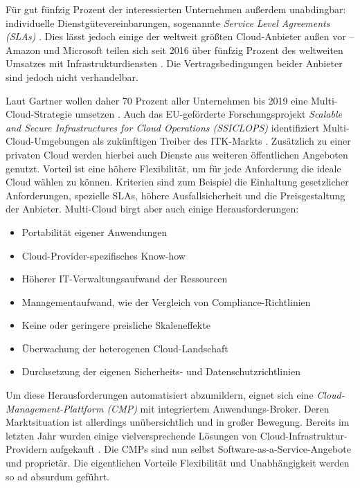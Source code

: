 Für gut fünfzig Prozent der interessierten Unternehmen außerdem unabdingbar: individuelle Dienstgütevereinbarungen, sogenannte \emph{Service Level Agreements (SLAs)} \cite{bitkom:2017:cloud-nutzung-unternehmen-auswahlkriterien}. Dies lässt jedoch einige der weltweit größten Cloud-Anbieter außen vor -- Amazon und Microsoft teilen sich seit 2016 über fünfzig Prozent des weltweiten Umsatzes mit Infrastrukturdiensten \cite{gartner:2017:cloud-market}. Die Vertragsbedingungen beider Anbieter sind jedoch nicht verhandelbar.

Laut Gartner wollen daher 70 Prozent aller Unternehmen bis 2019 eine Multi-Cloud-Strategie umsetzen \cite{gartner:2017:cloud-market-multicloud-trend}. Auch das EU-geförderte Forschungsprojekt \emph{Scalable and Secure Infrastructures for Cloud Operations (SSICLOPS)} identifiziert Multi-Cloud-Umgebungen als zukünftigen Treiber des ITK-Markts \cite{ssiclops:2015:d6.1-project-presentation}. Zusätzlich zu einer privaten Cloud werden hierbei auch Dienste aus weiteren öffentlichen Angeboten genutzt. Vorteil ist eine höhere Flexibilität, um für jede Anforderung die ideale Cloud wählen zu können. Kriterien sind zum Beispiel die Einhaltung gesetzlicher Anforderungen, spezielle SLAs, höhere Ausfallsicherheit und die Preisgestaltung der Anbieter. Multi-Cloud birgt aber auch einige Herausforderungen:

\begin{itemize}
	\item Portabilität eigener Anwendungen
	\item Cloud-Provider-spezifisches Know-how
	\item Höherer IT-Verwaltungsaufwand der Ressourcen
	\item Managementaufwand, wie der Vergleich von Compliance-Richtlinien
	\item Keine oder geringere preisliche Skaleneffekte
	\item Überwachung der heterogenen Cloud-Landschaft
	\item Durchsetzung der eigenen Sicherheits- und Datenschutzrichtlinien
\end{itemize}

Um diese Herausforderungen automatisiert abzumildern, eignet sich eine \emph{Cloud-Management-Plattform (CMP)} mit integriertem Anwendungs-Broker. Deren Marktsituation ist allerdings unübersichtlich und in großer Bewegung. Bereits im letzten Jahr wurden einige vielversprechende Lösungen von Cloud-Infrastruktur-Providern aufgekauft \cite{gartner:2017:cloud-market-multicloud-trend}. Die CMPs sind nun selbst Software-as-a-Service-Angebote und proprietär. Die eigentlichen Vorteile Flexibilität und Unabhängigkeit werden so ad absurdum geführt.

